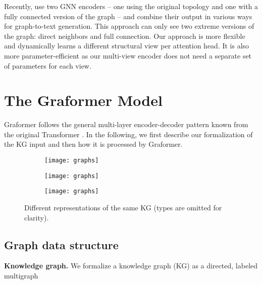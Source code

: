 \documentclass[11pt]{article}
\newcommand{\para}[1]{\noindent\textbf{#1.}}
\begin{document}
Recently,
\citet{ribeiro20}
use two GNN encoders
-- one using the original topology and one with a fully connected version of the graph --
and combine their output in various ways for graph-to-text generation.
This approach
can only see two extreme versions of the graph: direct
neighbors and full connection.
Our approach is more flexible
and
dynamically learns a different structural view per attention head.
It is also more parameter-efficient as our multi-view encoder does not need a separate set of parameters for each view.


\section{The Graformer Model}

Graformer follows the general multi-layer encoder-decoder pattern
known from the original Transformer \citep{vaswani17}.
In the following,
we first describe our formalization of the KG input and then how it is processed by Graformer.

\begin{figure}[!ht]
	\begin{subfigure}{.9\linewidth}
		\centering
		\texttt{[image: graphs]}
		\label{fig:graphs-1}
	\end{subfigure}
	
	\vspace{1em}
	\begin{subfigure}{\linewidth}
		\centering
		\texttt{[image: graphs]}
		\label{fig:graphs-2}
	\end{subfigure}
	
	\vspace{.5em}
	\begin{subfigure}{\linewidth}
		\centering
		\texttt{[image: graphs]}
		\label{fig:graphs-3}
	\end{subfigure}
	\caption{Different representations of the same KG (types are omitted for clarity).}
	\label{fig:graphs}
\end{figure}

\subsection{Graph data structure}
\label{sec:data-structure}

\para{Knowledge graph}
We formalize a knowledge graph (KG) as a directed, labeled multigraph
\end{document}
